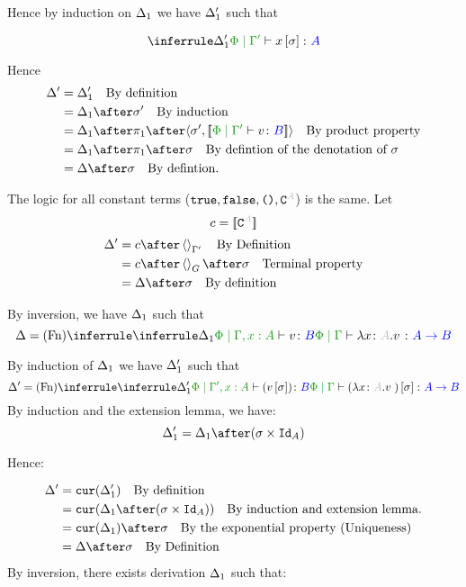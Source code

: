 \documentclass{report}
\begin{document}
Hence by induction on $\Delta_1$ we have $\Delta_1'$ such that

\begin{equation}
    \treeruleI{\D_1'}{\etyperelation{\P}{\G'}{x\ssi}{A}}
\end{equation}



Hence
\begin{align*}
    \D' & = \D_1' \qt{By definition}\\
        & = \D_1\after\si'\qt{By induction}\\
        & = \D_1\after\p\after\pr{\si'}{\deno{\etyperelation{\P}{\G'}{v}{B}}}\qt{By product property}\\
        & = \D_1\after\p\after\si\qt{By defintion of the denotation of $\si$}\\
        & = \D\after\si\qt{By defintion.}
\end{align*}

The logic for all constant terms ($\t,\f,\u,\const{A}$) is the same.
Let
\begin{equation}
    c = \deno{\const{A}}
\end{equation}
\begin{align*}
    \D' & = c\after\term{\G'}\qt{By Definition}\\
        & = c\after\term{G}\after\si\qt{Terminal property}\\
        & = \D\after\si\qt{By definition}
\end{align*}



By inversion, we have $\Delta_1$ such that
\begin{equation}
    \D = \ntreeruleI{Fn}{
        \treeruleI{\D_1}{\etyperelation{\P}{\G, x:A}{v}{B}}
    }{\etyperelation{\P}{\G}{\lam{x}{A}{v}}{\ab}}
\end{equation}

By induction of $\Delta_1$ we have $\Delta_1'$ such that
\begin{equation}
    \D' = \ntreeruleI{Fn}{
        \treeruleI{\D_1'}{\etyperelation{\P}{\G', x:A}{(v\ssi)}{B}}
    }{\etyperelation{\P}{\G}{(\lam{x}{A}{v})\ssi}{\ab}}
\end{equation}
By induction and the extension lemma, we have:
\begin{equation}
    \D_1' = \D_1\after(\si\times\Id{A})
\end{equation}

Hence:

\begin{align*}
    \D' &= \cur{\D_1'}\qt{By definition}\\
        &= \cur{\D_1\after(\si\times\Id{A})}\qt{By induction and extension lemma.}\\
        & = \cur{\D_1}\after\si\qt{By the exponential property (Uniqueness)}\\
        &= \D\after\si\qt{By Definition}\\
\end{align*}
By inversion, there exists derivation $\Delta_1$ such that:
\end{document}
